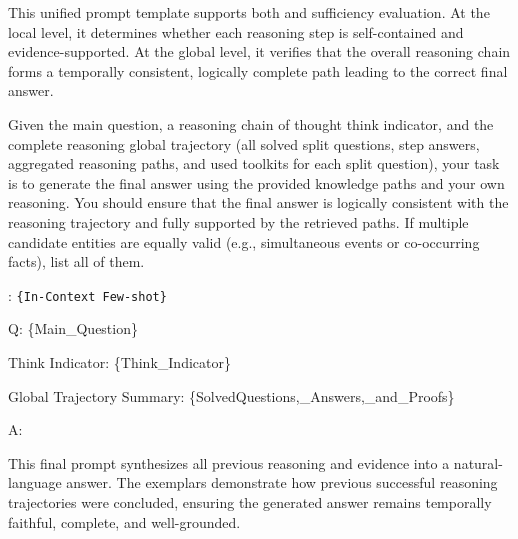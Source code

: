 \vspace{3mm}

\noindent
This unified prompt template supports both  and  sufficiency evaluation.  
At the local level, it determines whether each reasoning step is self-contained and evidence-supported.  
At the global level, it verifies that the overall reasoning chain forms a temporally consistent, logically complete path leading to the correct final answer.
\begin{center}
\begin{minipage}{0.9\columnwidth}
    \vspace{2mm}
    \centering
    \begin{tcolorbox}[title=Question Answering Generation Prompt Template]
        \small
Given the main question, a reasoning chain of thought think indicator, and the complete reasoning global trajectory (all solved split questions, step answers, aggregated reasoning paths, and used toolkits for each split question),  
your task is to generate the final answer using the provided knowledge paths and your own reasoning.
You should ensure that the final answer is logically consistent with the reasoning trajectory and fully supported by the retrieved paths.  
If multiple candidate entities are equally valid (e.g., simultaneous events or co-occurring facts), list all of them.


\vspace{5pt}
:
\texttt{\{In-Context Few-shot\}}
\vspace{5pt}

Q: \{Main\_Question\}

Think Indicator: \{Think\_Indicator\}

Global Trajectory Summary: \{SolvedQuestions,\_Answers,\_and\_Proofs\}

A:
    \end{tcolorbox}
\end{minipage}
\end{center}

\vspace{3mm}
\noindent
This final prompt synthesizes all previous reasoning and evidence into a natural-language answer.  
The exemplars demonstrate how previous successful reasoning trajectories were concluded, ensuring the generated answer remains temporally faithful, complete, and well-grounded.


